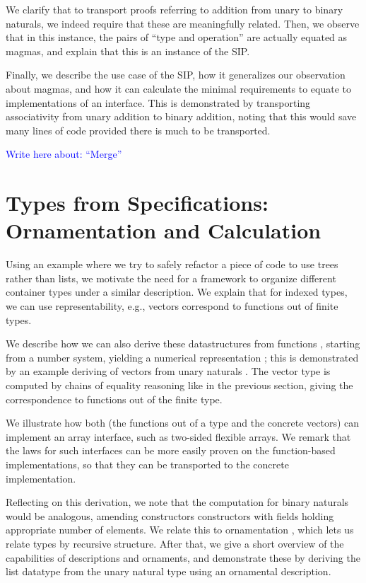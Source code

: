 \documentclass{article}
\theoremstyle{plain}%
\theoremstyle{definition}
\newcommand{\towrite}[1]{\par\textcolor{blue}{Write here about: ``#1''}\par}
\begin{document}
We clarify that to transport proofs referring to addition from unary to binary naturals, we indeed require that these are meaningfully related. Then, we observe that in this instance, the pairs of ``type and operation'' are actually equated as magmas, and explain that this is an instance of the SIP.

Finally, we describe the use case of the SIP, how it generalizes our observation about magmas, and how it can calculate the minimal requirements to equate to implementations of an interface. This is demonstrated by transporting associativity from unary addition to binary addition, noting that this would save many lines of code provided there is much to be transported.

\towrite{Merge}




\section{Types from Specifications: Ornamentation and Calculation}\label{sec:numrep}
Using an example where we try to safely refactor a piece of code to use trees rather than lists, we motivate the need for a framework to organize different container types under a similar description. We explain that for indexed types, we can use representability, e.g., vectors correspond to functions out of finite types.

We describe how we can also derive these datastructures from functions \cite{calcdata}, starting from a number system, yielding a numerical representation \cite{purelyfunctional}; this is demonstrated by an example deriving of vectors from unary naturals \cite{calcdata}. The vector type is computed by chains of equality reasoning like in the previous section, giving the correspondence to functions out of the finite type.

We illustrate how both (the functions out of a type and the concrete vectors) can implement an array interface, such as two-sided flexible arrays. We remark that the laws for such interfaces can be more easily proven on the function-based implementations, so that they can be transported to the concrete implementation.

Reflecting on this derivation, we note that the computation for binary naturals would be analogous, amending constructors constructors with fields holding appropriate number of elements. We relate this to ornamentation \cite{progorn}, which lets us relate types by recursive structure. After that, we give a short overview of the capabilities of descriptions and ornaments, and demonstrate these by deriving the list datatype from the unary natural type using an ornamental description.
\end{document}
